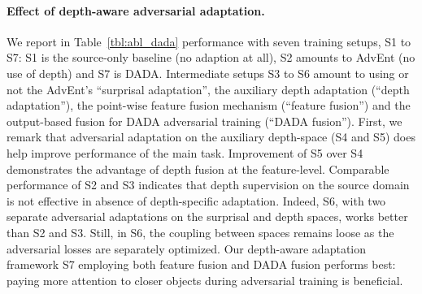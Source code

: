 \documentclass[10pt,twocolumn,letterpaper]{article}
\begin{document}
\paragraph{Effect of depth-aware adversarial adaptation.}
We report in Table~\ref{tbl:abl_dada} performance with seven training setups, S1 to S7: S1 is the source-only baseline (no  adaption at all), S2 amounts to AdvEnt (no use of depth) and S7 is DADA. Intermediate setups S3 to S6 amount to using or not the AdvEnt's ``surprisal adaptation'', the auxiliary depth adaptation (``depth adaptation''), the point-wise feature fusion mechanism (``feature fusion'') and the output-based fusion for DADA adversarial training (``DADA fusion'').
First, we remark that adversarial adaptation on the auxiliary depth-space (S4 and S5) does help improve performance of the main task.
Improvement of S5 over S4 demonstrates the advantage of depth fusion at the feature-level. Comparable performance of S2 and S3 indicates that depth supervision on the source domain is not effective in absence of depth-specific adaptation.
Indeed, S6, with two separate adversarial adaptations on the surprisal and depth spaces, works better than S2 and S3.
Still, in S6, the coupling between spaces remains loose as the adversarial losses are separately optimized.
Our depth-aware adaptation framework S7 employing both feature fusion and DADA fusion performs best: paying more attention to closer objects during adversarial training is beneficial.

\vspace{-0.3cm}
\end{document}
